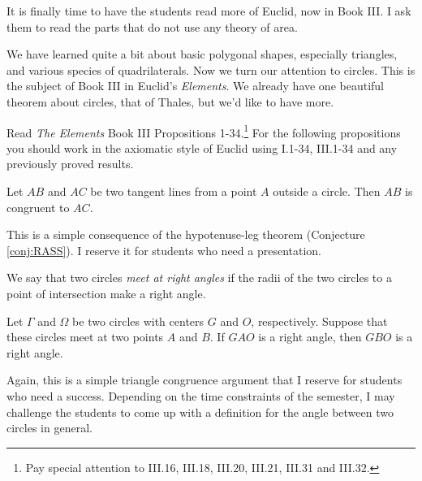 \begin{annotation}
{
\color{blue}
It is finally time to have the students read more of Euclid, now in Book III. I ask them to read the parts that do not use any theory of area.
}
\end{annotation}

We have learned quite a bit about basic polygonal shapes, especially triangles, and various species of quadrilaterals. Now we turn our attention to circles. This is the subject of Book III in Euclid's \emph{Elements}. We already have one beautiful theorem about circles, that of Thales, but we'd like to have more.


Read \emph{The Elements} Book III Propositions 1-34.\footnote{Pay special attention to III.16, III.18, III.20, III.21, III.31 and III.32.}
For the following propositions you should work in the axiomatic style of Euclid using I.1-34,  III.1-34 and any previously proved results.



\begin{conjecture}\label{conj:tangents-to-circle}
Let $AB$ and $AC$ be two tangent lines from a point $A$ outside a circle. Then $AB$ is congruent to $AC$.
\end{conjecture}

\begin{annotation}
{
\color{blue}
This is a simple consequence of the hypotenuse-leg theorem (Conjecture \ref{conj:RASS}). I reserve it for students who need a presentation.
}
\end{annotation}

\begin{definition}\label{defn:circles-perp}
We say that two circles \emph{meet at right angles} if the radii of the two circles to a point of intersection make a right angle.
\end{definition}

\begin{conjecture}\label{conj:perp-circles}
Let $\Gamma$ and $\Omega$ be two circles with centers $G$ and $O$, respectively. Suppose that these circles meet at two points $A$ and $B$. If $GAO$ is a right angle, then $GBO$ is a right angle.
\end{conjecture}

\begin{annotation}
{
\color{blue}
Again, this is a simple triangle congruence argument that I reserve for students who need a success. Depending on the time constraints of the semester, I may challenge the students to come up with a definition for the angle between two circles in general.
}
\end{annotation}

